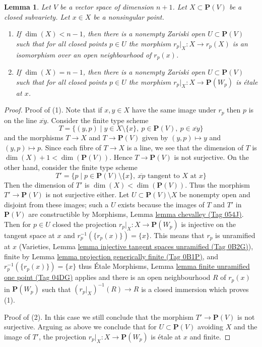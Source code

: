 \documentclass{amsart}
\theoremstyle{plain}
\newtheorem{lemma}[subsection]{Lemma}
\theoremstyle{definition}
\theoremstyle{remark}
\numberwithin{equation}{subsection}
\begin{document}
\begin{lemma}
\label{lemma-projection-generically-immersion}
Let $V$ be a vector space of dimension $n + 1$.
Let $X \subset \mathbf{P}(V)$ be a closed subvariety.
Let $x \in X$ be a nonsingular point.
\begin{enumerate}
\item If $\dim(X) < n - 1$, then there is a nonempty Zariski open
$U \subset \mathbf{P}(V)$ such that for all closed points $p \in U$ the
morphism $r_p|_X : X \to r_p(X)$ is an
isomorphism over an open neighbourhood of $r_p(x)$.
\item If $\dim(X) = n - 1$, then there is a nonempty Zariski open
$U \subset \mathbf{P}(V)$ such that for all closed points $p \in U$ the
morphism $r_p|_X : X \to \mathbf{P}(W_p)$ is \'etale at $x$.
\end{enumerate}
\end{lemma}

\begin{proof}
Proof of (1). Note that if $x, y \in X$ have the same image under
$r_p$ then $p$ is on the line $\overline{xy}$.
Consider the finite type scheme
$$
T = \{(y, p) \mid
y \in X \setminus \{x\},\ p \in \mathbf{P}(V),\ p \in \overline{xy}\}
$$
and the morphisms $T \to X$ and $T \to \mathbf{P}(V)$ given by
$(y, p) \mapsto y$ and $(y, p) \mapsto p$.
Since each fibre of $T \to X$ is a line, we see that
the dimension of $T$ is $\dim(X) + 1 < \dim(\mathbf{P}(V))$.
Hence $T \to \mathbf{P}(V)$ is not surjective. On the other hand,
consider the finite type scheme
$$
T' = \{p \mid
p \in \mathbf{P}(V) \setminus \{x\},
\ \overline{xp}\text{ tangent to }X\text{ at }x\}
$$
Then the dimension of $T'$ is $\dim(X) < \dim(\mathbf{P}(V))$.
Thus the morphism $T' \to \mathbf{P}(V)$ is not surjective either.
Let $U \subset \mathbf{P}(V) \setminus X$ be nonempty open and disjoint
from these images; such a $U$ exists because the images of $T$ and $T'$
in $\mathbf{P}(V)$ are constructible by
Morphisms, Lemma \href{https://stacks.math.columbia.edu/tag/054J}{lemma chevalley (Tag 054J)}.
Then for $p \in U$ closed the projection
$r_p|_X : X \to \mathbf{P}(W_p)$ is injective on the
tangent space at $x$ and $r_p^{-1}(\{r_p(x)\}) = \{x\}$.
This means that $r_p$ is unramified at $x$
(Varieties, Lemma \href{https://stacks.math.columbia.edu/tag/0B2G}{lemma injective tangent spaces unramified (Tag 0B2G)}),
finite by Lemma \href{https://stacks.math.columbia.edu/tag/0B1P}{lemma projection generically finite (Tag 0B1P)},
and $r_p^{-1}(\{r_p(x)\}) = \{x\}$ thus \'Etale Morphisms, Lemma
\href{https://stacks.math.columbia.edu/tag/04DG}{lemma finite unramified one point (Tag 04DG)} applies and
there is an open neighbourhood $R$ of $r_p(x)$
in $\mathbf{P}(W_p)$ such that $(r_p|_X)^{-1}(R) \to R$ is a
closed immersion which proves (1).

\medskip\noindent
Proof of (2). In this case we still conclude that the morphism
$T' \to \mathbf{P}(V)$ is not surjective.
Arguing as above we conclude that for $U \subset \mathbf{P}(V)$
avoiding $X$ and the image of $T'$, the projection
$r_p|_X : X \to \mathbf{P}(W_p)$ is \'etale at $x$ and finite.
\end{proof}
\end{document}
